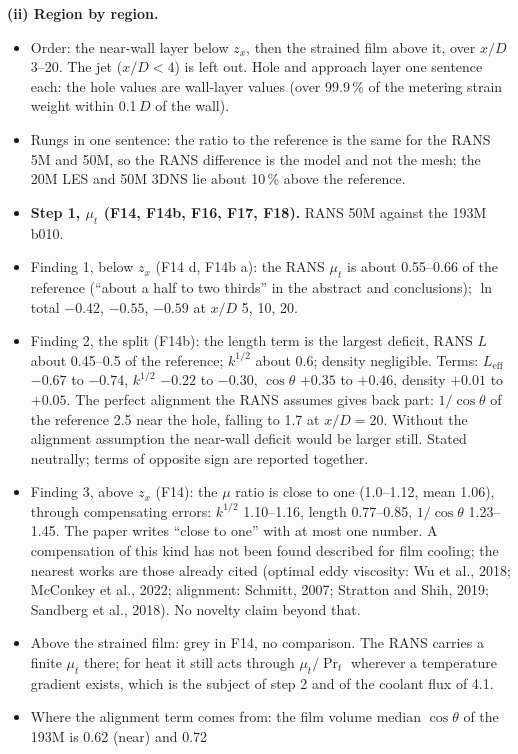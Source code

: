 \documentclass[10pt]{article}
\begin{document}
\textbf{(ii) Region by region.}
\begin{itemize}
\item Order: the near-wall layer below $z_x$, then the strained film above it, over $x/D$ 3--20. The jet
  ($x/D<4$) is left out. Hole and approach layer one sentence each: the hole values are wall-layer values (over
  99.9\,\% of the metering strain weight within 0.1\,$D$ of the wall).
\item Rungs in one sentence: the ratio to the reference is the same for the RANS 5M and 50M, so the RANS
  difference is the model and not the mesh; the 20M LES and 50M 3DNS lie about 10\,\% above the reference.
\item \textbf{Step 1, $\mu_t$ (F14, F14b, F16, F17, F18).} RANS 50M against the 193M b010.
\item Finding 1, below $z_x$ (F14 d, F14b a): the RANS $\mu_t$ is about 0.55--0.66 of the reference (``about a
  half to two thirds'' in the abstract and conclusions); $\ln$ total $-0.42$, $-0.55$, $-0.59$ at $x/D$ 5, 10,
  20.
\item Finding 2, the split (F14b): the length term is the largest deficit, RANS $L$ about 0.45--0.5 of the
  reference; $k^{1/2}$ about 0.6; density negligible. Terms: $L_{\mathrm{eff}}$ $-0.67$ to $-0.74$, $k^{1/2}$
  $-0.22$ to $-0.30$, $\cos\theta$ $+0.35$ to $+0.46$, density $+0.01$ to $+0.05$. The perfect alignment the RANS assumes gives back part:
  $1/\cos\theta$ of the reference 2.5 near the hole, falling to 1.7 at $x/D=20$. Without the alignment assumption
  the near-wall deficit would be larger still. Stated neutrally; terms of opposite sign are reported together.
\item Finding 3, above $z_x$ (F14): the $\mu$ ratio is close to one (1.0--1.12, mean 1.06), through
  compensating errors: $k^{1/2}$ 1.10--1.16, length 0.77--0.85, $1/\cos\theta$ 1.23--1.45. The paper writes ``close
  to one'' with at most one number. A compensation of this kind has not been found described for film cooling;
  the nearest works are those already cited (optimal eddy viscosity: Wu et al., 2018; McConkey et al., 2022;
  alignment: Schmitt, 2007; Stratton and Shih, 2019; Sandberg et al., 2018). No novelty claim beyond that.
\item Above the strained film: grey in F14, no comparison. The RANS carries a finite $\mu_t$ there; for heat it
  still acts through $\mu_t/\Pr_t$ wherever a temperature gradient exists, which is the subject of step 2 and of
  the coolant flux of 4.1.
\item Where the alignment term comes from: the film volume median $\cos\theta$ of the 193M is 0.62 (near) and 0.72

\end{itemize}
\end{document}
